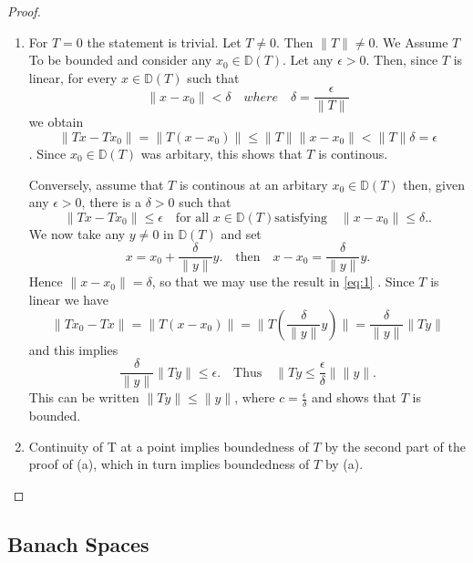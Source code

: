 \documentclass{article}
\theoremstyle{remark}
\begin{document}
\begin{proof}
  \begin{enumerate}
    \item  For $T = 0$ the statement is trivial. Let $T \neq 0$. Then $\|T\| \neq 0$. We Assume $T$ To be bounded and consider any $x_0 \in \mathbb{D}\left( T \right) $. Let any $\epsilon >  0$. Then, since $T$ is linear, for every $x \in \mathbb{D}\left(  T\right) $ such that 
      \[
      \|x - x_0\| < \delta \quad where \quad \delta = \frac{\epsilon}{\|T\|} 
      \] we obtain \[
      \|Tx- Tx_0\| = \|T\left( x - x_0 \right) \| \le \|T\| \|x - x_0\| < \|T\|\delta = \epsilon
    \]. Since $x_0 \in \mathbb{D}\left( T \right) $ was arbitary, this shows that $T$ is continous. 
    \par Conversely, assume that $T$ is continous at an arbitary $x_0 \in \mathbb{D}\left( T \right) $ then, given any $\epsilon > 0$, there is a $\delta > 0$ such that 
    \begin{equation}
    \label{eq:1}
      \|Tx- Tx_0\| \le \epsilon \quad \text{for all } x \in \mathbb{D}\left( T \right) \text{satisfying} \quad \|x- x_0\|\le \delta.       
    .\end{equation}
     We now take any $y \neq 0$ in $\mathbb{D}\left( T \right)  $ and set \[
    x = x_0+ \frac{\delta}{\|y\|} y. \quad \text{then} \quad x - x_0 = \frac{\delta}{\|y\|} y. 
  \]  Hence $\|x- x_0\| = \delta$,  so that we may use the result in \eqref{eq:1} . Since $T$ is linear we have  \[
  \| Tx_0 - Tx\| = \|T\left( x-x_0 \right)  \| =  \|T\left( \frac{\delta}{\|y\|}y \right) \| = \frac{\delta}{\|y\|} \|Ty\|
  \] and this implies \[
  \frac{\delta}{\|y\|}\|Ty\| \le \epsilon. \quad \text{Thus} \quad \|Ty \le \frac{\epsilon}{\delta}\|\|y\| 
  .\] This can be written $\|Ty\| \le  \|y\|$, where $c = \frac{\epsilon}{\delta}$ and shows that $T$ is bounded.  
\item Continuity of T at a point implies boundedness of $T$ by the second part of the proof of (a), which in turn implies boundedness of $T$ by (a).

  \end{enumerate}
\end{proof}

\subsection{Banach Spaces}%
\label{sub: Banach Spaces}
\end{document}
